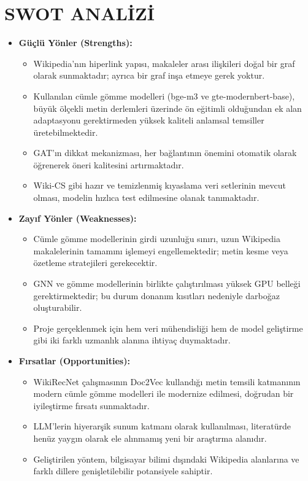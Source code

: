 \chapter{SWOT ANALİZİ}
\thispagestyle{empty}

\begin{itemize}
    \item \textbf{Güçlü Yönler (Strengths):}
    \begin{itemize}
        \item Wikipedia'nın hiperlink yapısı, makaleler arası ilişkileri doğal bir graf olarak sunmaktadır; ayrıca bir graf inşa etmeye gerek yoktur.
        \item Kullanılan cümle gömme modelleri (bge-m3 ve gte-modernbert-base), büyük ölçekli metin derlemleri üzerinde ön eğitimli olduğundan ek alan adaptasyonu gerektirmeden yüksek kaliteli anlamsal temsiller üretebilmektedir.
        \item GAT'ın dikkat mekanizması, her bağlantının önemini otomatik olarak öğrenerek öneri kalitesini artırmaktadır.
        \item Wiki-CS \cite{mernyei2020wikics} gibi hazır ve temizlenmiş kıyaslama veri setlerinin mevcut olması, modelin hızlıca test edilmesine olanak tanımaktadır.
    \end{itemize}

    \item \textbf{Zayıf Yönler (Weaknesses):}
    \begin{itemize}
        \item Cümle gömme modellerinin girdi uzunluğu sınırı, uzun Wikipedia makalelerinin tamamını işlemeyi engellemektedir; metin kesme veya özetleme stratejileri gerekecektir.
        \item GNN ve gömme modellerinin birlikte çalıştırılması yüksek GPU belleği gerektirmektedir; bu durum donanım kısıtları nedeniyle darboğaz oluşturabilir.
        \item Proje gerçeklenmek için hem veri mühendisliği hem de model geliştirme gibi iki farklı uzmanlık alanına ihtiyaç duymaktadır.
    \end{itemize}

    \item \textbf{Fırsatlar (Opportunities):}
    \begin{itemize}
        \item WikiRecNet \cite{wikirecnet2020} çalışmasının Doc2Vec kullandığı metin temsili katmanının modern cümle gömme modelleri ile modernize edilmesi, doğrudan bir iyileştirme fırsatı sunmaktadır.
        \item LLM'lerin hiyerarşik sunum katmanı olarak kullanılması, literatürde henüz yaygın olarak ele alınmamış yeni bir araştırma alanıdır.
        \item Geliştirilen yöntem, bilgisayar bilimi dışındaki Wikipedia alanlarına ve farklı dillere genişletilebilir potansiyele sahiptir.
    \end{itemize}


\end{itemize}
